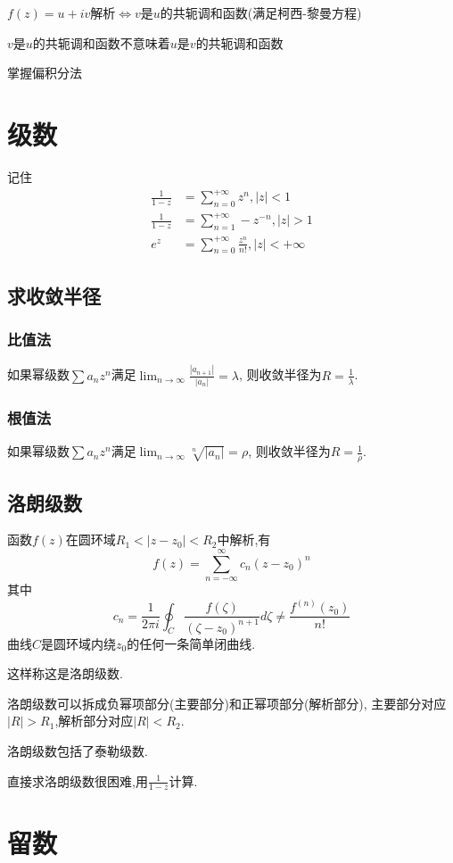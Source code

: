 \documentclass[12pt, a4paper, oneside]{ctexart}
\begin{document}
$f(z)=u+iv$解析$\Leftrightarrow$$v$是$u$的共轭调和函数(满足柯西-黎曼方程)

$v$是$u$的共轭调和函数不意味着$u$是$v$的共轭调和函数

掌握偏积分法
\section{级数}
记住
\begin{align*}
    \frac{1}{1-z} &= \sum_{n=0}^{+\infty}z^n,|z| < 1\\
    \frac{1}{1-z} &= \sum_{n=1}^{+\infty}-z^{-n},|z|>1\\
    e^z &= \sum_{n=0}^{+\infty}\frac{z^n}{n!},|z|<+\infty
\end{align*}
\subsection{求收敛半径}
\subsubsection{比值法}
如果幂级数$\sum a_n z^n$满足$\lim_{n \to \infty}\frac{|a_{n+1}|}{|a_n|} = \lambda$,
则收敛半径为$R = \frac{1}{\lambda}$.
\subsubsection{根值法}
如果幂级数$\sum a_n z^n$满足$\lim_{n \to \infty}\sqrt[n]{|a_n|} = \rho$,
则收敛半径为$R = \frac{1}{\rho}$.
\subsection{洛朗级数}
函数$f(z)$在圆环域$R_1<|z-z_0|<R_2$中解析,有
$$
    f(z) = \sum_{n=-\infty}^{\infty}c_n(z-z_0)^n
$$
其中
$$
    c_n = \frac{1}{2\pi i}\oint_C \frac{f(\zeta)}{(\zeta-z_0)^{n+1}}d\zeta \ne \frac{f^{(n)}(z_0)}{n!}
$$
曲线$C$是圆环域内绕$z_0$的任何一条简单闭曲线.

这样称这是洛朗级数.

洛朗级数可以拆成负幂项部分(主要部分)和正幂项部分(解析部分),
主要部分对应$|R|>R_1$,解析部分对应$|R|<R_2$.

洛朗级数包括了泰勒级数.

直接求洛朗级数很困难,用$\frac{1}{1-z}$计算.
\section{留数}
\end{document}
